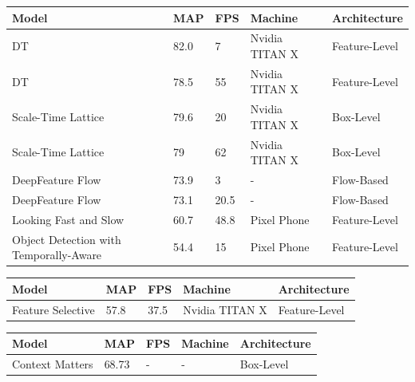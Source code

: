 \documentclass[conference]{IEEEtran}
\begin{document}
\begin{tabular}{ | p{2cm} | p{2em}| p{2em} | p{4em} | p{5em} | } 
 \hline
 Model & MAP & FPS & Machine & Architecture \\
 \hline
 DT \cite{b8} & 82.0 & 7 & Nvidia TITAN X & Feature-Level \\
 \hline
 DT \cite{b8} & 78.5 & 55 & Nvidia TITAN X & Feature-Level \\
 \hline
 Scale-Time Lattice \cite{b10} & 79.6 & 20 & Nvidia TITAN X & Box-Level \\
 \hline
 Scale-Time Lattice \cite{b10} & 79 & 62 & Nvidia TITAN X & Box-Level \\
 \hline
 DeepFeature Flow \cite{b3} & 73.9 & 3 & - & Flow-Based \\
 \hline
 DeepFeature Flow \cite{b3} & 73.1 & 20.5 & - & Flow-Based \\
 \hline
 Looking Fast and Slow \cite{b7} & 60.7 & 48.8 & Pixel Phone & Feature-Level \\
 \hline
 Object Detection with Temporally-Aware \cite{b2} & 54.4 & 15 & Pixel Phone & Feature-Level \\
 \hline
\end{tabular}

\begin{tabular}{ | p{2cm} | p{2em}| p{2em} | p{4em} | p{5em} | } 
 \hline
 Model & MAP & FPS & Machine & Architecture \\
 \hline
 Feature Selective \cite{b6} & 57.8 & 37.5 & Nvidia TITAN X & Feature-Level \\
 \hline
\end{tabular}

\begin{tabular}{ | p{2cm} | p{2em}| p{2em} | p{4em} | p{5em} | } 
 \hline
 Model & MAP & FPS & Machine & Architecture \\
 \hline
 Context Matters \cite{b4} & 68.73 & - & - & Box-Level \\
 \hline
\end{tabular}
\end{document}
